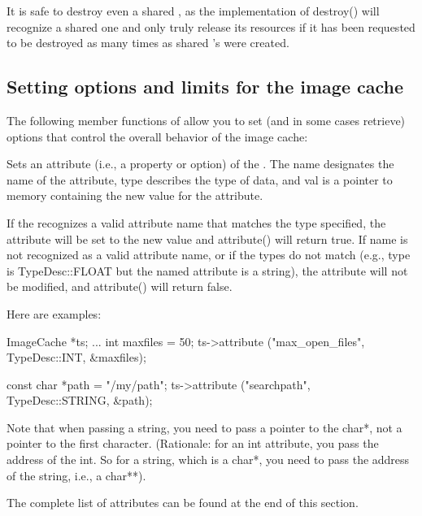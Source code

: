 It is safe to destroy even a shared \ImageCache, as the implementation
of {\cf destroy()} will recognize a shared one and only truly release
its resources if it has been requested to be destroyed as many times as
shared \ImageCache's were created.
\apiend

\subsection{Setting options and limits for the image cache}
\label{sec:imagecache:api:options}

The following member functions of \ImageCache allow you to set
(and in some cases retrieve) options that control the overall
behavior of the image cache:


Sets an attribute (i.e., a property or option) of the \ImageCache.
The {\cf name} designates the name of the attribute, {\cf type}
describes the type of data, and {\cf val} is a pointer to memory 
containing the new value for the attribute.

If the \ImageCache recognizes a valid attribute name that matches the
type specified, the attribute will be set to the new value and {\cf
  attribute()} will return {\cf true}.  If {\cf name} is not recognized
as a valid attribute name, or if the types do not match (e.g., {\cf
  type} is {\cf TypeDesc::FLOAT} but the named attribute is a string),
the attribute will not be modified, and {\cf attribute()} will return
{\cf false}.

Here are examples:

\begin{code}
      ImageCache *ts; 
      ...
      int maxfiles = 50;
      ts->attribute ("max_open_files", TypeDesc::INT, &maxfiles);

      const char *path = "/my/path";
      ts->attribute ("searchpath", TypeDesc::STRING, &path);
\end{code}

Note that when passing a string, you need to pass a pointer to the {\cf
  char*}, not a pointer to the first character.  (Rationale: for an {\cf
  int} attribute, you pass the address of the {\cf int}.  So for a
string, which is a {\cf char*}, you need to pass the address of the
string, i.e., a {\cf char**}).

The complete list of attributes can be found at the end of this section.


